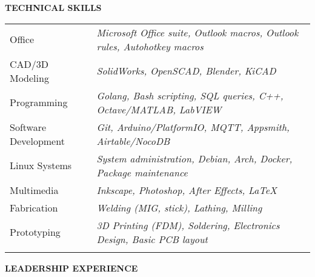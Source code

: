 \documentclass{article}
\begin{document}
 
 \textbf{\textcolor{title}{\uppercase{ Technical Skills }}}  \medskip \\ \hfill
 \begin{tabularx}{\textwidth}{R{3.5cm} L}
	   
	 \textcolor{accent}{ Office } & \textit{ Microsoft Office suite, Outlook macros, Outlook rules, Autohotkey macros } \\ \hfill
	   
	 \textcolor{accent}{ CAD/3D Modeling } & \textit{ SolidWorks, OpenSCAD, Blender, KiCAD } \\ \hfill
	   
	 \textcolor{accent}{ Programming } & \textit{ Golang, Bash scripting, SQL queries, C++, Octave/MATLAB, LabVIEW } \\ \hfill
	   
	 \textcolor{accent}{ Software Development } & \textit{ Git, Arduino/PlatformIO, MQTT, Appsmith, Airtable/NocoDB } \\ \hfill
	   
	 \textcolor{accent}{ Linux Systems } & \textit{ System administration, Debian, Arch, Docker, Package maintenance } \\ \hfill
	   
	 \textcolor{accent}{ Multimedia } & \textit{ Inkscape, Photoshop, After Effects, LaTeX } \\ \hfill
	   
	 \textcolor{accent}{ Fabrication } & \textit{ Welding (MIG, stick), Lathing, Milling } \\ \hfill
	   
	 \textcolor{accent}{ Prototyping } & \textit{ 3D Printing (FDM), Soldering, Electronics Design, Basic PCB layout } \\ \hfill
	   
 \end{tabularx}
 
  
 \textbf{\textcolor{title}{\uppercase{ Leadership Experience }}}  \medskip \\ \hfill
 \begin{tabularx}{\textwidth}{R{3.5cm} L}
	   
 \end{tabularx}
   
 
   
 
 
\end{document}
